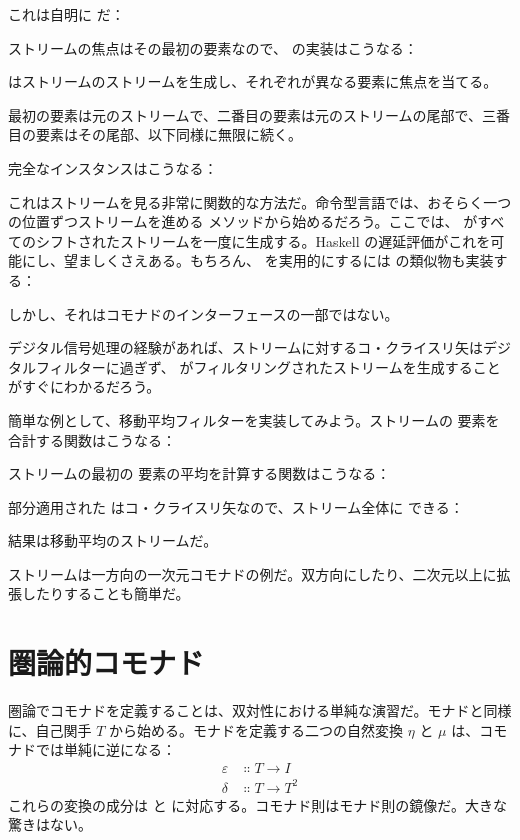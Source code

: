 これは自明に  だ：

ストリームの焦点はその最初の要素なので、 の実装はこうなる：

 はストリームのストリームを生成し、それぞれが異なる要素に焦点を当てる。

最初の要素は元のストリームで、二番目の要素は元のストリームの尾部で、三番目の要素はその尾部、以下同様に無限に続く。

完全なインスタンスはこうなる：

これはストリームを見る非常に関数的な方法だ。命令型言語では、おそらく一つの位置ずつストリームを進める  メソッドから始めるだろう。ここでは、 がすべてのシフトされたストリームを一度に生成する。Haskell の遅延評価がこれを可能にし、望ましくさえある。もちろん、 を実用的にするには  の類似物も実装する：

しかし、それはコモナドのインターフェースの一部ではない。

デジタル信号処理の経験があれば、ストリームに対するコ・クライスリ矢はデジタルフィルターに過ぎず、 がフィルタリングされたストリームを生成することがすぐにわかるだろう。

簡単な例として、移動平均フィルターを実装してみよう。ストリームの  要素を合計する関数はこうなる：

ストリームの最初の  要素の平均を計算する関数はこうなる：

部分適用された  はコ・クライスリ矢なので、ストリーム全体に  できる：

結果は移動平均のストリームだ。

ストリームは一方向の一次元コモナドの例だ。双方向にしたり、二次元以上に拡張したりすることも簡単だ。

\section{圏論的コモナド}

圏論でコモナドを定義することは、双対性における単純な演習だ。モナドと同様に、自己関手 $T$ から始める。モナドを定義する二つの自然変換 $\eta$ と $\mu$ は、コモナドでは単純に逆になる：
\begin{align*}
  \varepsilon & \Colon T \to I   \\
  \delta      & \Colon T \to T^2
\end{align*}
これらの変換の成分は  と  に対応する。コモナド則はモナド則の鏡像だ。大きな驚きはない。

